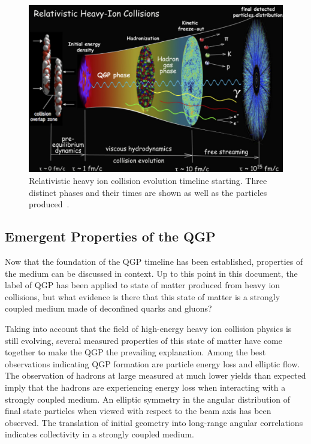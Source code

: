 \begin{figure}[!ht]
\centering
\includegraphics[width=0.78\linewidth]{figs/qgp_evolution_timeline.png}
\caption{Relativistic heavy ion collision evolution timeline starting. Three distinct phases and their times are shown as well as the particles produced~\cite{Heinz:2013wva}.}
\label{fig:qgp_timeline}
\end{figure}

\subsection{Emergent Properties of the QGP}
Now that the foundation of the QGP timeline has been established, properties of the medium can be discussed in context. Up to this point in this document, the label of QGP has been applied to state of matter produced from heavy ion collisions, but what evidence is there that this state of matter is a strongly coupled medium made of deconfined quarks and gluons?

Taking into account that the field of high-energy heavy ion collision physics is still evolving, several measured properties of this state of matter have come together to make the QGP the prevailing explanation. Among the best observations indicating QGP formation are particle energy loss and elliptic flow. The observation of hadrons at large \pt measured at much lower yields than expected imply that the hadrons are experiencing energy loss when interacting with a strongly coupled medium.  An elliptic symmetry in the angular distribution of final state particles when viewed with respect to the beam axis has been observed. The translation of initial geometry into long-range angular correlations indicates collectivity in a strongly coupled medium.


